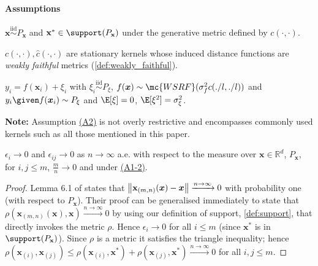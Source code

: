 \paragraph{Assumptions}
\begin{description}[labelindent=1cm]
\label{desc:assumptions_nngp}
    \item[(A1)\label{ass:X}] \(\mathbf{x}\overset{\textrm{iid}}{\sim}P_\mathbf{x}\) and \(\mathbf{x}^* \in \support(P_\mathbf{x})\) under the generative metric defined by \(c(\cdot,\cdot)\).
    \item[(A2)\label{ass:nngp_k}] \(c(\cdot,\cdot),\hat{c}(\cdot,\cdot)\) are stationary kernels whose induced distance functions are \emph{weakly faithful} metrics (\autoref{def:weakly_faithful}). 
    \item[(A3)\label{ass:nngp_y}]  \(y_i=f(\bm{x}_i) + \xi_i\) with \(\xi_i\overset{\textrm{iid}}{\sim}P_\xi\), \(f(\bm{x})\sim \mc{WSRF}(\sigma_f^2 c(./l,./l))\) and \(y_i\given f(\bm{x}_i) \sim P_\xi\) and $\E[\xi]=0$, $\E[\xi^2]=\sigma_\xi^2$.
\end{description}

\textbf{Note:} Assumption \hyperref[{desc:assumptions_nngp}]{(A2)} is not overly restrictive and encompasses commonly used kernels such as all those mentioned in this paper.

\begin{lemma}
    \label{lem:eps_limit}
    \(\epsilon_i\rightarrow0\) and \(\epsilon_{ij}\rightarrow0\) as \(n\rightarrow\infty\) a.e. with respect to the measure over \(\mathbf{x}\in\mathbb{R}^d\), \(P_\mathbf{x}\), for \(i,j\leq m\), \(\frac{m}{n}\rightarrow0\) and under \hyperref[{desc:assumptions_nngp}]{(A1-2)}.
\end{lemma}
\begin{proof}
    Lemma 6.1 of \cite{Gyorfi2010} states that \(\norm{\mathbf{x}_{(m,n)}(\bm{x})-\bm{x}}\xrightarrow{n\rightarrow\infty}0\) with probability one (with respect to \(P_\mathbf{x}\)). Their proof can be generalised immediately to state that \(\rho(\mathbf{x}_{(m,n)}(\bm{x}), \bm{x})\xrightarrow{n\rightarrow\infty}0\) by using our definition of support, \ref{def:support}, that directly invokes the metric \(\rho\). Hence \(\epsilon_i\rightarrow 0\) for all \(i\leq m\) (since \(\bm{x}^*\) is in \(\support(P_\mathbf{x})\)). Since \(\rho\) is a metric it satisfies the triangle inequality; hence \(\rho(\mathbf{x}_{(i)},\mathbf{x}_{(j)}) \leq \rho(\mathbf{x}_{(i)},\bm{x}^*) + \rho(\mathbf{x}_{(j)}, \bm{x}^*) \xrightarrow{n\rightarrow\infty}0\) for all \(i,j \leq m\).
\end{proof}

